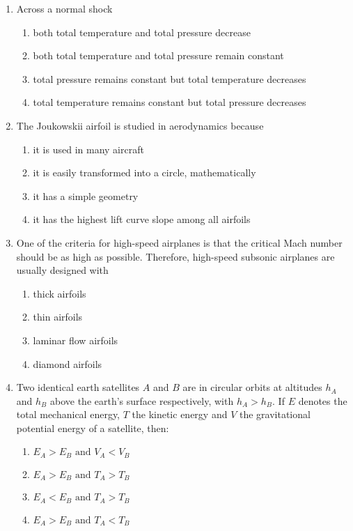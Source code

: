 \documentclass[journal]{IEEEtran}
\begin{document}
\begin{enumerate}[start=18]
	\item Across a normal shock
\begin{enumerate}
\item both total temperature and total pressure decrease 
\item both total temperature and total pressure remain constant 
\item total pressure remains constant but total temperature decreases 
\item total temperature remains constant but total pressure decreases
\end{enumerate}

\item  The Joukowskii airfoil is studied in aerodynamics because
\begin{enumerate}
\item it is used in many aircraft
\item it is easily transformed into a circle, mathematically
\item it has a simple geometry
\item it has the highest lift curve slope among all airfoils
\end{enumerate}

\item  One of the criteria for high-speed airplanes is that the critical Mach number should be as high as possible. Therefore, high-speed subsonic airplanes are usually designed with 
\begin{multicols}{2}
\begin{enumerate}
\item thick airfoils
\item thin airfoils
\item laminar flow airfoils
\item diamond airfoils
\end{enumerate}
\end{multicols}

\item  Two identical earth satellites $A$ and $B$ are in circular orbits at altitudes $h_A$ and $h_B$ above the earth's surface respectively, with $h_A > h_B$. If $E$ denotes the total mechanical energy, $T$ the kinetic energy and $V$ the gravitational potential energy of a satellite, then:
\begin{multicols}{2}
\begin{enumerate}
\item $E_A > E_B \text{ and } V_A < V_B$
\item $E_A > E_B \text{ and } T_A > T_B$
\item $E_A < E_B \text{ and } T_A > T_B$
\item $E_A > E_B \text{ and } T_A < T_B$
\end{enumerate}
\end{multicols}


\end{enumerate}
\end{document}
